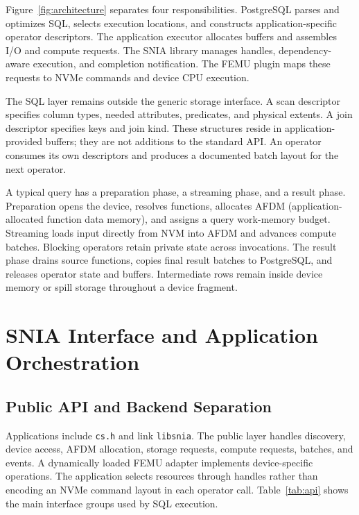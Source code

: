\documentclass[sigconf, nonacm]{acmart}
\begin{document}
Figure~\ref{fig:architecture} separates four responsibilities. PostgreSQL
parses and optimizes SQL, selects execution locations, and constructs
application-specific operator descriptors. The application executor allocates
buffers and assembles I/O and compute requests. The SNIA library manages
handles, dependency-aware execution, and completion notification. The FEMU
plugin maps these requests to NVMe commands and device CPU execution.

The SQL layer remains outside the generic storage interface. A scan descriptor
specifies column types, needed attributes, predicates, and physical extents.
A join descriptor specifies keys and join kind. These structures reside in
application-provided buffers; they are not additions to the standard API.
An operator consumes its own descriptors and produces a documented batch
layout for the next operator.

A typical query has a preparation phase, a streaming phase, and a result
phase. Preparation opens the device, resolves functions, allocates AFDM
(application-allocated function data memory), and assigns a query work-memory
budget. Streaming loads input directly from NVM into AFDM and advances
compute batches. Blocking operators retain private state across invocations.
The result phase drains source functions, copies final result batches to
PostgreSQL, and releases operator state and buffers. Intermediate rows remain
inside device memory or spill storage throughout a device fragment.

\section{SNIA Interface and Application Orchestration}
\label{sec:api}
\subsection{Public API and Backend Separation}
Applications include \texttt{cs.h} and link \texttt{libsnia}. The public layer
handles discovery, device access, AFDM allocation, storage requests, compute
requests, batches, and events. A dynamically loaded FEMU adapter implements
device-specific operations. The application selects resources through
handles rather than encoding an NVMe command layout in each operator call.
Table~\ref{tab:api} shows the main interface groups used by SQL execution.
\end{document}
